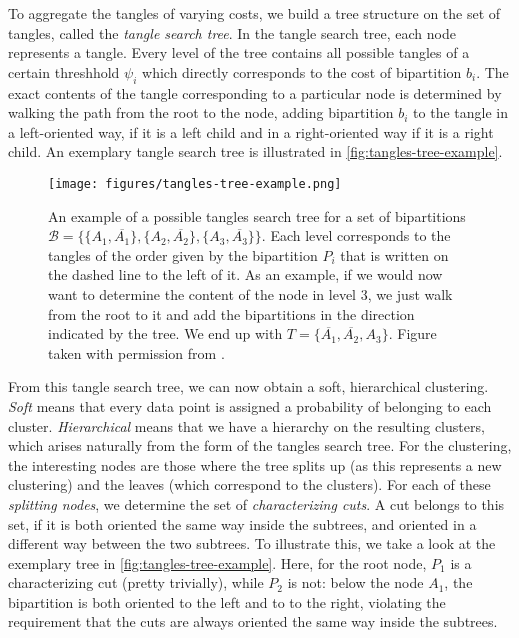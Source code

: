 To aggregate the tangles of varying costs, we build a tree structure on the set of tangles, called the \textit{tangle search tree}. In the tangle search tree, 
each node represents a tangle. Every level of the tree contains all possible tangles of a certain threshhold $\psi_i$ which directly corresponds to the cost of bipartition $b_i$. 
The exact contents of the tangle corresponding to a particular node is determined by walking the path from the root to the node, adding bipartition $b_i$ to the tangle in a left-oriented way, if it is a left child and in a right-oriented way if it is a right child. An exemplary tangle search tree is illustrated in \autoref{fig:tangles-tree-example}. 

\begin{figure}[h]
    \centering
    \texttt{[image: figures/tangles-tree-example.png]}
    \caption{An example of a possible tangles search tree for a set of bipartitions $\mathcal{B} = \{\{A_1, \overline{A_1}\}, \{A_2, \overline{A_2}\}, \{A_3, \overline{A_3}\} \}$. 
        Each level corresponds to the tangles of the order given by the bipartition $P_i$ that is written on the dashed line to the left of it.
        As an example, if we would now want to determine
        the content of the node in level 3, we just walk from the root to it and add the bipartitions in the direction indicated by the tree. 
        We end up with $T = \{\overline{A_1}, \overline{A_2}, A_3\}$. 
        Figure taken with permission from \cite{klepperClusteringTanglesAlgorithmic2021}.}
    \label{fig:tangles-tree-example}
\end{figure}

From this tangle search tree, we can now obtain a soft, hierarchical clustering. \textit{Soft} means that every data point is assigned
a probability of belonging to each cluster. \textit{Hierarchical} means that we have a hierarchy on the resulting clusters, which arises naturally
from the form of the tangles search tree. For the clustering, the interesting nodes are those
where the tree splits up (as this represents a new clustering) and the leaves (which correspond to the clusters). 
For each of these \textit{splitting nodes}, we determine the set of \textit{characterizing cuts}.
A cut belongs to this set, if it is both oriented the same way inside the subtrees, and oriented in a different way between the two subtrees.
To illustrate this, we take a look at the exemplary tree in \autoref{fig:tangles-tree-example}. Here, for the root node, $P_1$ is a characterizing cut (pretty trivially),
while $P_2$ is not: below the node $A_1$, the bipartition is both oriented to the left and to to the right, violating the requirement that the cuts are always oriented
the same way inside the subtrees. 

